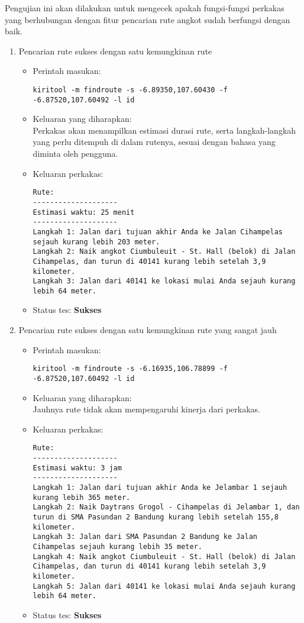 Pengujian ini akan dilakukan untuk mengecek apakah fungsi-fungsi perkakas yang berhubungan dengan fitur pencarian rute angkot sudah berfungsi dengan baik.

\begin{enumerate}
	\item Pencarian rute sukses dengan satu kemungkinan rute
	\begin{itemize}
		\item Perintah masukan:
		\begin{verbatim}
kiritool -m findroute -s -6.89350,107.60430 -f -6.87520,107.60492 -l id
		\end{verbatim}
		\item Keluaran yang diharapkan: \\
		Perkakas akan menampilkan estimasi durasi rute, serta langkah-langkah yang perlu ditempuh di dalam rutenya, sesuai dengan bahasa yang diminta oleh pengguna.
		\item Keluaran perkakas:
		\begin{lstlisting}
Rute:
--------------------
Estimasi waktu: 25 menit 
--------------------
Langkah 1: Jalan dari tujuan akhir Anda ke Jalan Cihampelas sejauh kurang lebih 203 meter.
Langkah 2: Naik angkot Ciumbuleuit - St. Hall (belok) di Jalan Cihampelas, dan turun di 40141 kurang lebih setelah 3,9 kilometer.
Langkah 3: Jalan dari 40141 ke lokasi mulai Anda sejauh kurang lebih 64 meter.
		\end{lstlisting}
		\item Status tes: \textbf{Sukses}
	\end{itemize}
	
	\item Pencarian rute sukses dengan satu kemungkinan rute yang sangat jauh
	\begin{itemize}
		\item Perintah masukan:
		\begin{verbatim}
kiritool -m findroute -s -6.16935,106.78899 -f -6.87520,107.60492 -l id
		\end{verbatim}
		\item Keluaran yang diharapkan: \\
		Jauhnya rute tidak akan mempengaruhi kinerja dari perkakas.
		\item Keluaran perkakas:
		\begin{lstlisting}
Rute:
--------------------
Estimasi waktu: 3 jam 
--------------------
Langkah 1: Jalan dari tujuan akhir Anda ke Jelambar 1 sejauh kurang lebih 365 meter.
Langkah 2: Naik Daytrans Grogol - Cihampelas di Jelambar 1, dan turun di SMA Pasundan 2 Bandung kurang lebih setelah 155,8 kilometer.
Langkah 3: Jalan dari SMA Pasundan 2 Bandung ke Jalan Cihampelas sejauh kurang lebih 35 meter.
Langkah 4: Naik angkot Ciumbuleuit - St. Hall (belok) di Jalan Cihampelas, dan turun di 40141 kurang lebih setelah 3,9 kilometer.
Langkah 5: Jalan dari 40141 ke lokasi mulai Anda sejauh kurang lebih 64 meter.
		\end{lstlisting}
		\item Status tes: \textbf{Sukses}
	\end{itemize}
	

\end{enumerate}
